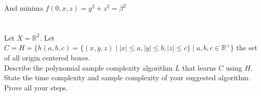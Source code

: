 \documentclass[12pt]{article}
\newcommand\tab[1][1cm]{\hspace*{#1}}
\begin{document}
And minima $f(0,x,z) = y^2 + z^2 = \beta^2 $


\section*{}


\tab Let $X = \mathbb{R}^2$. Let $ C = H =  \lbrace h(a,b,c) = \lbrace(x,y,z) \mid |x| \leq a, |y| \leq b, |z| \leq c \rbrace \mid  a,b,c \in \mathbb{R}^+\rbrace $ the set of all origin centered boxes. \\
\tab Describe the polynomial sample complexity algorithm $L$ that learns $C$ using $H$. State the time complexity and sample complexity of your suggested algorithm. Prove all your steps.
\end{document}
